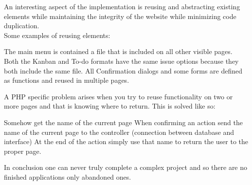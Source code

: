 \documentclass{beamer}
\begin{document}
\slideContent{}
{

\color{white}
An interesting aspect of the implementation is reusing and abstracting existing elements while maintaining the integrity of the website while minimizing code duplication.
\\
\vspace{1ex}
\pause
Some examples of reusing elements:
\begin{itemize}
\color{white}
\q The main menu is contained a file that is included on all other visible pages.
\q Both the Kanban and To-do formats have the same issue options because they both include the same file.
\q All Confirmation dialogs and some forms are defined as functions and reused in multiple pages.

\end{itemize}

}

\slideContent{}
{

\color{white}
A PHP specific problem arises when you try to reuse functionality on two or more pages and that is knowing where to return.
\s
This is solved like so:
\begin{itemize}
\color{white}
\q Somehow get the name of the current page
\pause
\q When confirming an action send the name of the current page to the controller (connection between database and interface)
\pause
\q At the end of the action simply use that name to return the user to the proper page.

\end{itemize}

}

{
\color{white}

In conclusion one can never truly complete a complex project and so there are no finished applications only abandoned ones.

}
\end{document}
